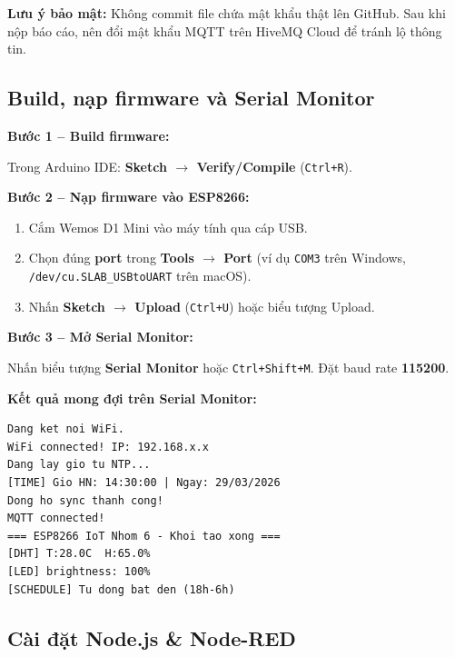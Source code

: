 \documentclass[13pt,a4paper]{article}
\newcommand{\code}[1]{\texttt{#1}}
\begin{document}
\begin{mdframed}[backgroundcolor=yellow!20, linecolor=yellow!60]
    \textbf{Lưu ý bảo mật:} Không commit file chứa mật khẩu thật lên GitHub. Sau khi nộp báo cáo, nên đổi mật khẩu MQTT trên HiveMQ Cloud để tránh lộ thông tin.
\end{mdframed}

\subsection{Build, nạp firmware và Serial Monitor}
\label{sec:build}

\textbf{Bước 1 -- Build firmware:}

Trong Arduino IDE: \textbf{Sketch $\rightarrow$ Verify/Compile} (\code{Ctrl+R}).

\textbf{Bước 2 -- Nạp firmware vào ESP8266:}

\begin{enumerate}[label=\arabic*., leftmargin=1.5cm]
    \item Cắm Wemos D1 Mini vào máy tính qua cáp USB.
    \item Chọn đúng \textbf{port} trong \textbf{Tools $\rightarrow$ Port} (ví dụ \code{COM3} trên Windows, \code{/dev/cu.SLAB\_USBtoUART} trên macOS).
    \item Nhấn \textbf{Sketch $\rightarrow$ Upload} (\code{Ctrl+U}) hoặc biểu tượng Upload.
\end{enumerate}

\textbf{Bước 3 -- Mở Serial Monitor:}

Nhấn biểu tượng \textbf{Serial Monitor} hoặc \code{Ctrl+Shift+M}. Đặt baud rate \textbf{115200}.

\textbf{Kết quả mong đợi trên Serial Monitor:}

\begin{lstlisting}[style=serialog, caption={Serial Monitor output khi khởi động}, label={lst:serial}]
Dang ket noi WiFi.
WiFi connected! IP: 192.168.x.x
Dang lay gio tu NTP...
[TIME] Gio HN: 14:30:00 | Ngay: 29/03/2026
Dong ho sync thanh cong!
MQTT connected!
=== ESP8266 IoT Nhom 6 - Khoi tao xong ===
[DHT] T:28.0C  H:65.0%
[LED] brightness: 100%
[SCHEDULE] Tu dong bat den (18h-6h)
\end{lstlisting}

\subsection{Cài đặt Node.js \& Node-RED}
\label{sec:noderedinstall}
\end{document}
